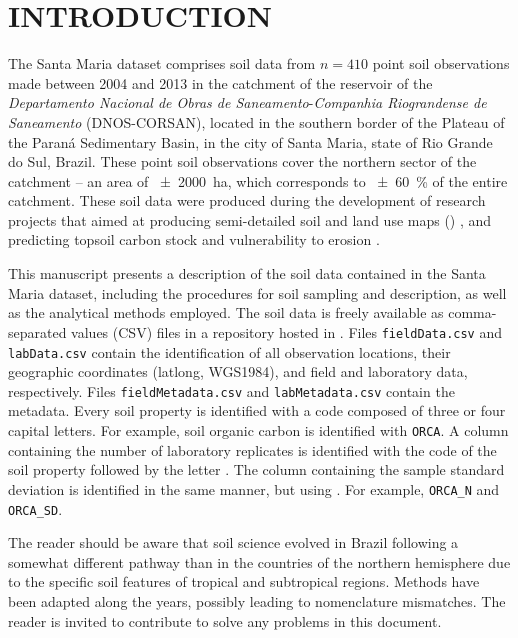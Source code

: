 \formatchapter

\section{INTRODUCTION}
\label{sec:chap04-introduction}

The Santa Maria dataset comprises soil data from $n = 410$ point soil observations made between \num{2004} and 
\num{2013} in the catchment of the reservoir of the \textit{Departamento Nacional de Obras de 
Saneamento}-\textit{Companhia Riograndense de Saneamento} (DNOS-CORSAN), located in the southern border of the 
Plateau of the Paraná Sedimentary Basin, in the city of Santa Maria, state of Rio Grande do Sul, Brazil. These 
point soil observations cover the northern sector of the catchment -- an area of \SI{\pm2000}{\hectare}, which 
corresponds to \SI{\pm60}{\percent} of the entire catchment. These soil data were produced during the 
development of research projects that aimed at producing semi-detailed soil and land use maps () 
\cite{Pedron2005, Miguel2010, SamuelRosaEtAl2011a, MiguelEtAl2012}, and predicting topsoil carbon stock and 
vulnerability to erosion \cite{Samuel-Rosa2009, MouraBueno2012, Miguel2013}.

This manuscript presents a description of the soil data contained in the Santa Maria dataset, including the 
procedures for soil sampling and description, as well as the analytical methods employed. The soil data is 
freely available as comma-separated values (CSV) files in a repository hosted in \dnosgeneral{}. Files 
\texttt{fieldData.csv} and \texttt{labData.csv} contain the identification of all observation locations, their 
geographic coordinates (latlong, WGS1984), and field and laboratory data, respectively. Files 
\texttt{fieldMetadata.csv} and \texttt{labMetadata.csv} contain the metadata. Every soil property is 
identified with a code composed of three or four capital letters. For example, soil organic carbon is 
identified with \texttt{ORCA}. A column containing the number of laboratory replicates is identified with the 
code of the soil property followed by the letter . The column containing the sample standard deviation is 
identified in the same manner, but using . For example, \texttt{ORCA\_N} and \texttt{ORCA\_SD}.

The reader should be aware that soil science evolved in Brazil following a somewhat different pathway than in 
the countries of the northern hemisphere due to the specific soil features of tropical and subtropical 
regions. Methods have been adapted along the years, possibly leading to nomenclature mismatches. The reader is 
invited to contribute to solve any problems in this document.

